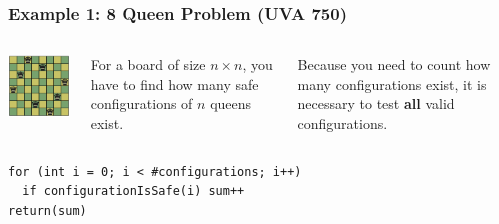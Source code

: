\begin{frame}[fragile]
  \frametitle{Example 1: 8 Queen Problem (UVA 750)}
  \begin{columns}
    \includegraphics[width=1\textwidth]{../img/8queen}\\

    For a board of size $n \times n$, you have to find \alert{how many} safe
    configurations of $n$ queens exist.
    \bigskip

    Because you need to count \alert{how many} configurations exist, it is
    necessary to test {\bf all} valid configurations.
  \end{columns}
    \bigskip


\begin{verbatim}
for (int i = 0; i < #configurations; i++)
  if configurationIsSafe(i) sum++
return(sum)
\end{verbatim}
\end{frame}

